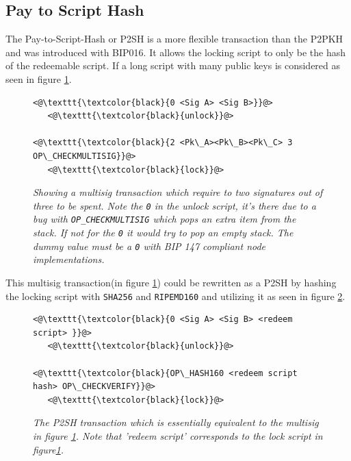 \subsection{Pay to Script Hash}

The Pay-to-Script-Hash or P2SH is a more flexible transaction than the P2PKH and was introduced with BIP016\cite{bip:0016:p2sh}. It allows the locking script to only be the hash of the redeemable script. If a long script with many public keys is considered as seen in figure \ref{fig:cumbersome:script}.

\newpage

\begin{figure}
	\centering
	\begin{lstlisting}
<@\texttt{\textcolor{black}{0 <Sig A> <Sig B>}}@>   
   <@\texttt{\textcolor{black}{unlock}}@>
	
<@\texttt{\textcolor{black}{2 <Pk\_A><Pk\_B><Pk\_C> 3 OP\_CHECKMULTISIG}}@>
   <@\texttt{\textcolor{black}{lock}}@>
	\end{lstlisting}
	
	\caption{\textit{ Showing a multisig transaction which require to two signatures out of three to be spent. Note the \texttt{0} in the unlock script, it's there due to a bug with \texttt{OP\_CHECKMULTISIG} which pops an extra item from the stack. If not for the \texttt{0} it would try to pop an empty stack. The dummy value must be a \texttt{0} with BIP 147 compliant node implementations\cite{bip:0147:dummy:zero}.
	}}
	\label{fig:cumbersome:script}
\end{figure} 

This multisig transaction(in figure \ref{fig:cumbersome:script}) could be rewritten as a P2SH by hashing the locking script with \texttt{SHA256} and  \texttt{RIPEMD160} and utilizing it as seen in figure \ref{fig:p2sh}.

\begin{figure}[hbt!]
	
	\begin{lstlisting}
<@\texttt{\textcolor{black}{0 <Sig A> <Sig B> <redeem script> }}@>   
   <@\texttt{\textcolor{black}{unlock}}@>
	
<@\texttt{\textcolor{black}{OP\_HASH160 <redeem script hash> OP\_CHECKVERIFY}}@>
   <@\texttt{\textcolor{black}{lock}}@>
	\end{lstlisting}
	
	\caption{\textit{ The P2SH transaction which is essentially equivalent to the multisig in figure \ref{fig:cumbersome:script}.
			Note that 'redeem script' corresponds to the lock script in figure\ref{fig:cumbersome:script}.
	}}
	\label{fig:p2sh}
\end{figure}

